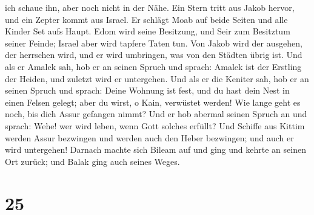 ich schaue ihn, aber noch nicht in der Nähe. Ein Stern tritt aus Jakob
hervor, und ein Zepter kommt aus Israel. Er schlägt Moab auf beide
Seiten und alle Kinder Set aufs Haupt.  Edom wird seine
Besitzung, und Seir zum Besitztum seiner Feinde; Israel aber wird
tapfere Taten tun.  Von Jakob wird der ausgehen, der
herrschen wird, und er wird umbringen, was von den Städten übrig ist.
 Und als er Amalek sah, hob er an seinen Spruch und
sprach: Amalek ist der Erstling der Heiden, und zuletzt wird er
untergehen.  Und als er die Keniter sah, hob er an seinen
Spruch und sprach: Deine Wohnung ist fest, und du hast dein Nest in
einen Felsen gelegt;  aber du wirst, o Kain, verwüstet
werden! Wie lange geht es noch, bis dich Assur gefangen nimmt?
 Und er hob abermal seinen Spruch an und sprach: Wehe!
wer wird leben, wenn Gott solches erfüllt?  Und Schiffe
aus Kittim werden Assur bezwingen und werden auch den Heber bezwingen;
und auch er wird untergehen!  Darnach machte sich Bileam
auf und ging und kehrte an seinen Ort zurück; und Balak ging auch seines
Weges.

\hypertarget{section-24}{%
\section{25}\label{section-24}}

